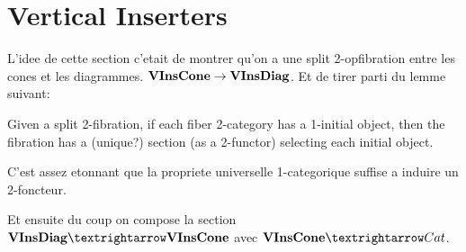 \section{Vertical Inserters}

L'idee de cette section c'etait de montrer qu'on a une split 2-opfibration entre les cones et les diagrammes.
$  \mathbf{VInsCone} \rightarrow \mathbf{VInsDiag}$. Et de tirer parti du lemme suivant:
\begin{lemma}
  \label{lem:twofib-section}
  Given a split 2-fibration, if each fiber 2-category has a 1-initial object, 
  then the fibration has a (unique?) section (as a 2-functor) selecting each initial object.
\end{lemma}
\begin{remark}
  C'est assez etonnant que la propriete universelle 1-categorique suffise a induire un 2-foncteur.
\end{remark}
Et ensuite du coup on compose la section $\VInsDiag → \VInsCone$ avec $\VInsCone → Cat$.

